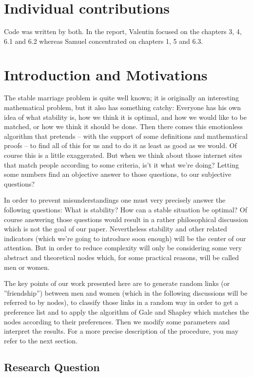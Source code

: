 \documentclass[11pt]{article}
\begin{document}
\section{Individual contributions} %

Code was written by both. In the report, Valentin focused on the chapters 3, 4, 6.1 and 6.2 whereas Samuel concentrated on chapters 1, 5 and 6.3.

\section{Introduction and Motivations}

The stable marriage problem is quite well known; it is originally an interesting mathematical 
problem, but it also has something catchy: Everyone has his own idea of what stability is, how we 
think it is optimal, and how we would like to be matched, or how we think it should be done. Then there comes this emotionless algorithm
that pretends -- with the support of some definitions and mathematical proofs -- to find all of this for us and to do it as least as good
as we would. Of course this is a little exaggerated. But when we think about those internet sites that match people according to some  criteria,
is't it what we're doing? Letting some numbers find an objective answer to those questions, to our subjective questions?

In order to prevent misunderstandings one must very precisely answer the following questions: What is stability? How can a stable situation be optimal?
Of course answering those questions would result in a rather philosophical discussion which is not the goal of our paper.
Nevertheless stability and other related indicators (which we’re going to introduce soon enough) will be the center of our attention.
But in order to reduce complexity will only be considering some very abstract and theoretical nodes which, for some practical reasons, will be
called men or women.

The key points of our work presented here are to generate random links (or ''friendship'') between men and women (which in the following 
discussions will be referred to by nodes), to classify those links in a random way in order to get a preference list and to apply the algorithm 
of Gale and Shapley which matches the nodes according to their preferences. Then we modify some parameters and interpret the results. For a more precise 
description of the procedure, you may refer to the next section.

\subsection{Research Question}
\end{document}
